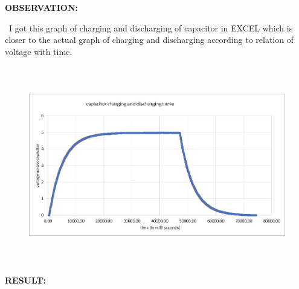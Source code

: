 \documentclass[12pt]{article}
\begin{document}
\vspace{\baselineskip}
{\fontsize{14pt}{16.8pt}\selectfont \textbf{OBSERVATION:}\par}\par

\vspace{\baselineskip}
{\fontsize{14pt}{16.8pt}\selectfont \  I got this graph of charging and discharging of capacitor in EXCEL which is closer to the actual graph of charging and discharging according to relation of voltage with time.\par}\par

\vspace{\baselineskip}
\begin{figure}[H]
	\begin{Center}
		\includegraphics[width=6.14in,height=3.4in]{./media/image4.jpeg}
	\end{Center}
\end{figure}

\par

\vspace{\baselineskip}

\vspace{\baselineskip}
{\fontsize{14pt}{16.8pt}\selectfont \textbf{RESULT:\  }\par}\par

{\fontsize{14pt}{16.8pt}\selectfont \textbf{ }\par}\par
\end{document}
